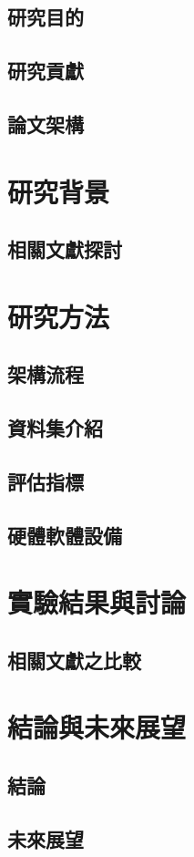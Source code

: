 \documentclass{ccuthesis}
\begin{document}
\subsection{研究目的}
\subsection{研究貢獻}
\subsection{論文架構}

\section{研究背景}
\subsection{相關文獻探討}

\section{研究方法}
\subsection{架構流程}
\subsection{資料集介紹}
\subsection{評估指標}
\subsection{硬體軟體設備}

\section{實驗結果與討論}
\subsection{相關文獻之比較}

\section{結論與未來展望}
\subsection{結論}
\subsection{未來展望}


\clearpage


\end{document}
